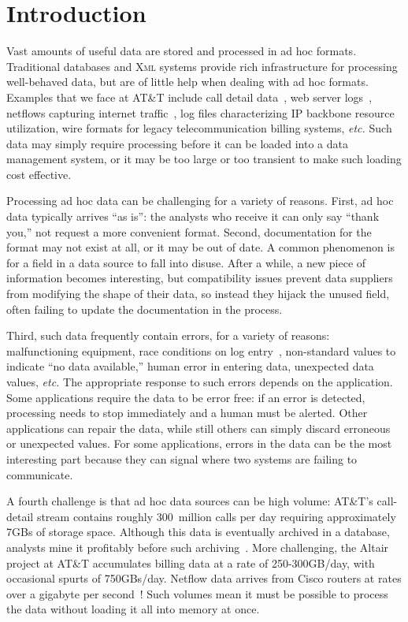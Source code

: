 \documentclass{sigplanconf}
\newcommand{\ningaui}{Altair}
\newcommand{\etc}{{\em etc.\/}}
\newcommand{\xml}{\textsc{Xml}}
\begin{document}
\section{Introduction}
Vast amounts of useful data are stored and processed in ad hoc formats.
Traditional databases and \xml{} systems provide rich infrastructure
for processing well-behaved data, but are of little help when dealing with ad hoc formats.
Examples that we face at AT\&T include call detail data~\cite{hancock-toplas}, 
web server logs~\cite{wpp}, 
netflows capturing internet traffic~\cite{netflow}, 
log files characterizing IP backbone resource utilization,
wire formats for legacy telecommunication billing systems, 
\etc{}
Such data may simply require processing before it can be loaded into a
data management system, or it may be too large or too transient to
make such loading cost effective.

Processing ad hoc data can be challenging for a variety of
reasons. First, ad hoc data typically arrives ``as is'': the analysts
who receive it can only say ``thank you,'' not request a more convenient format. 
Second, documentation for the format may not exist at all, or it may be
out of date.  A common phenomenon is for a field in a
data source to fall into disuse.  After a while, a new piece of
information becomes interesting, but compatibility issues prevent 
data suppliers from modifying the
shape of their data, so instead they hijack the unused field, often
failing to update the documentation in the process.

Third, such data frequently contain errors, for a variety of
reasons: malfunctioning equipment, race conditions on log
entry~\cite{wpp}, non-standard values to indicate ``no data
available,'' human error in entering data, unexpected data
values, \etc{} The appropriate response to such errors depends on the application. Some applications require the data to be error free: 
if an error is detected, processing needs to stop immediately and a human
must be alerted.  Other applications can repair the data, while still
others can simply discard erroneous or unexpected values.  
For some applications,
errors in the data can be the most interesting part  because
they can signal where two systems are failing to communicate.

A fourth challenge is that ad hoc data sources can be high volume:
AT\&T's call-detail stream contains roughly 300~million calls per day
requiring approximately 7GBs of storage space. Although this data is
eventually archived in a database, analysts mine it profitably before
such archiving~\cite{kdd98,kdd99}. More challenging, the \ningaui{} project at AT\&T
accumulates billing data at a rate
of 250-300GB/day, with occasional spurts of 750GBs/day. Netflow data
arrives from Cisco routers at rates over a gigabyte per
second~\cite{gigascope}! Such volumes mean it must be possible to
process the data without loading it all into memory at once.
\end{document}
